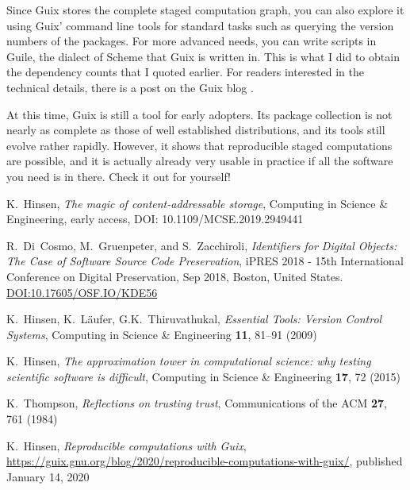 \documentclass[10pt,journal,compsoc]{IEEEtran}
\begin{document}
Since Guix stores the complete staged computation graph, you can also explore it using Guix' command line tools for standard tasks such as querying the version numbers of the packages. For more advanced needs, you can write scripts in Guile, the dialect of Scheme that Guix is written in. This is what I did to obtain the dependency counts that I quoted earlier. For readers interested in the technical details, there is a post on the Guix blog \cite{guix-blog}.

At this time, Guix is still a tool for early adopters. Its package collection is not nearly as complete as those of well established distributions, and its tools still evolve rather rapidly. However, it shows that reproducible staged computations are possible, and it is actually already very usable in practice if all the software you need is in there. Check it out for yourself!


%
%
%

\begin{thebibliography}{1}

K.~Hinsen,
\textit{The magic of content-addressable storage},
Computing in Science \& Engineering, early access,
DOI: 10.1109/MCSE.2019.2949441

R.~Di~Cosmo, M.~Gruenpeter, and S.~Zacchiroli,
\textit{Identifiers for Digital Objects: The Case of Software Source Code Preservation},
iPRES 2018 - 15th International Conference on Digital Preservation, Sep 2018, Boston, United States.
\href{http://doi.org/10.17605/OSF.IO/KDE56}{DOI:10.17605/OSF.IO/KDE56}

K.~Hinsen, K.~L\"{a}ufer, G.K.~Thiruvathukal,
\textit{Essential Tools: Version Control Systems},
Computing in Science \& Engineering \textbf{11}, 81--91 (2009)

K.~Hinsen,
\textit{The approximation tower in computational science: why testing scientific software is difficult},
Computing in Science \& Engineering \textbf{17}, 72 (2015)

K.~Thompson,
\textit{Reflections on trusting trust},
Communications of the ACM \textbf{27}, 761 (1984)

K.~Hinsen,
\textit{Reproducible computations with Guix},
\href{https://guix.gnu.org/blog/2020/reproducible-computations-with-guix/}{https://guix.gnu.org/blog/2020/reproducible-computations-with-guix/},
published January 14, 2020

\end{thebibliography}
\end{document}
